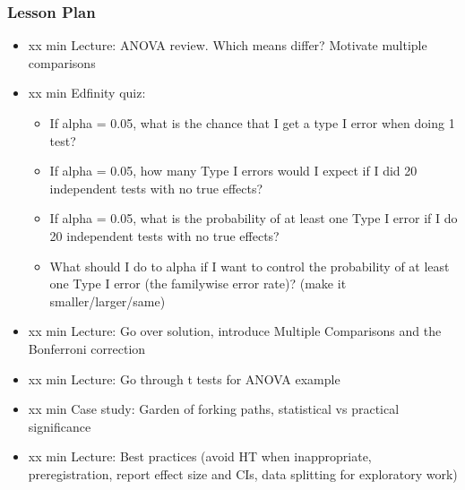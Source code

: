 \begin{frame}
    \frametitle{Lesson Plan}
    \begin{itemize}
        \item xx min Lecture: ANOVA review. Which means differ? Motivate multiple comparisons
        \item xx min Edfinity quiz:
        \begin{itemize}
            \item If alpha = 0.05, what is the chance that I get a type I error when doing 1 test?
            \item If alpha = 0.05, how many Type I errors would I expect if I did 20 independent tests with no true effects?
            \item If alpha = 0.05, what is the probability of at least one Type I error if I do 20 independent tests with no true effects?
            \item What should I do to alpha if I want to control the probability of at least one Type I error (the familywise error rate)? (make it smaller/larger/same)
        \end{itemize}
        \item xx min Lecture: Go over solution, introduce Multiple Comparisons and the Bonferroni correction
        \item xx min Lecture: Go through t tests for ANOVA example
        \item xx min Case study: Garden of forking paths, statistical vs practical significance
        \item xx min Lecture: Best practices (avoid HT when inappropriate, preregistration, report effect size and CIs, data splitting for exploratory work)
    \end{itemize}
\end{frame}

    
